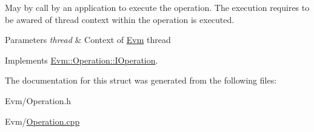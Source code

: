 May by call by an application to execute the operation. The execution requires to be awared of thread context within the operation is executed. 
\begin{DoxyParams}{Parameters}
{\em thread} & Context of \mbox{\hyperlink{namespace_evm}{Evm}} thread \\
\hline
\end{DoxyParams}


Implements \mbox{\hyperlink{struct_evm_1_1_operation_1_1_i_operation_a7285631335da103423c01471dedeb1d7}{Evm\+::\+Operation\+::\+I\+Operation}}.



The documentation for this struct was generated from the following files\+:\begin{DoxyCompactItemize}
\item 
Evm/Operation.\+h\item 
Evm/\mbox{\hyperlink{_operation_8cpp}{Operation.\+cpp}}\end{DoxyCompactItemize}

